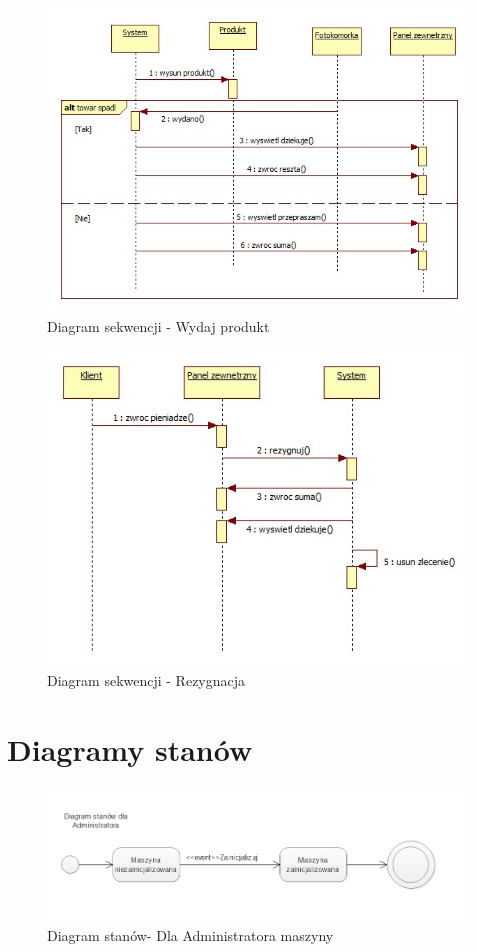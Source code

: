 \documentclass[a4paper, 11pt]{article}
\begin{document}
\begin{figure}[H]
\centerline{\includegraphics[scale=0.8]{../Diagrams/wydajProdukt}}
\caption{Diagram sekwencji - Wydaj produkt}
\end{figure}

\begin{figure}[H]
\centerline{\includegraphics[scale=0.9]{../Diagrams/rezygnacja}}
\caption{Diagram sekwencji - Rezygnacja}
\end{figure}


\section{Diagramy stanów}

\begin{figure}[H]
\centerline{\includegraphics[scale=0.9]{../Diagrams/stanyAdmin}}
\caption{Diagram stanów- Dla Administratora maszyny}
\end{figure}
\end{document}
